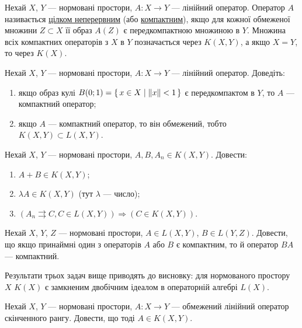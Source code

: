 
\begin{theory}
    Нехай $X$, $Y$ --- нормовані простори, $A: X \to Y$ --- лінійний оператор.
    Оператор $A$ називається \ul{цілком неперервним} (або \ul{компактним}),
    якщо для кожної обмеженої множини $Z \subset X$ її образ $A(Z)$ є передкомпактною
    множиною в $Y$. 
    Множина всіх компактних операторів з $X$ в $Y$ позначається через 
    $K(X,Y)$, а якщо $X = Y$, то через $K(X)$.
\end{theory}

\begin{exercise}
    Нехай $X$, $Y$ --- нормовані простори, $A: X \to Y$ --- лінійний оператор. Доведіть:
    \begin{enumerate}
        \item якщо образ кулі $B(0;1) = \set{x \in X \mid \left\lVert x\right\rVert < 1}$ є передкомпактом в $Y$, то $A$ --- компактний оператор;
        \item якщо $A$ --- компактний оператор, то він обмежений, тобто $K(X,Y) \subset L(X,Y)$.
    \end{enumerate}
\end{exercise}

\begin{exercise}
    Нехай $X$, $Y$ --- нормовані простори, $A, B, A_n \in K(X,Y)$. Довести:
    \begin{enumerate}
        \item $A+B \in K(X, Y)$;
        \item $\lambda A \in K(X, Y)$ (тут $\lambda$ --- число);
        \item $\left( A_n \rightrightarrows C, C\in L(X, Y)\right) \Rightarrow \left( C \in K(X, Y)\right)$.
    \end{enumerate}
\end{exercise}

\begin{exercise}
    Нехай $X$, $Y$, $Z$ --- нормовані простори, $A \in L(X, Y)$, $B \in L(Y, Z)$.
    Довести, що якщо принаймні один з операторів $A$ або $B$ є компактним, то й оператор $BA$ --- компактний.
\end{exercise}

\begin{theory}
    Результати трьох задач вище приводять до висновку: для нормованого простору $X$ $K(X)$ 
    є замкненим двобічним ідеалом в операторній алгебрі $L(X)$.
\end{theory}

\begin{exercise}
    Нехай $X$, $Y$ --- нормовані простори, $A: X \to Y$ --- обмежений лінійний оператор
    скінченного рангу. Довести, що тоді $A \in K(X, Y)$.
\end{exercise}

